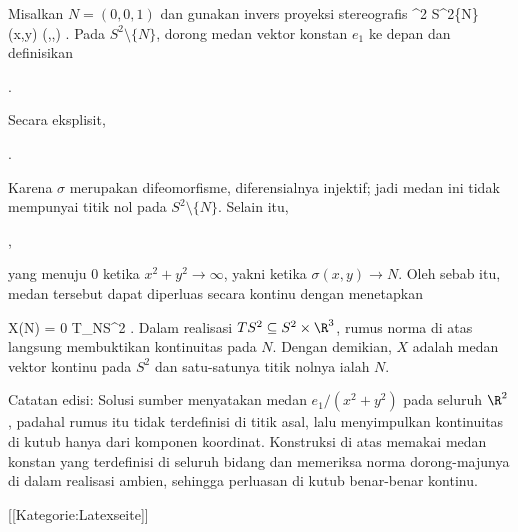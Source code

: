 Misalkan $N=(0,0,1)$ dan gunakan invers proyeksi stereografis
\maabbeledisp {\sigma} {\R^2} {S^2\setminus\{N\}
} {(x,y)} {\left(,,\right)
} {.}
Pada $S^2\setminus\{N\}$, dorong medan vektor konstan $e_1$ ke depan dan definisikan

 { . }

Secara eksplisit,

 { . }

Karena $\sigma$ merupakan difeomorfisme, diferensialnya injektif; jadi medan ini tidak mempunyai titik nol pada $S^2\setminus\{N\}$. Selain itu,

 { , }

yang menuju $0$ ketika $x^2+y^2\to\infty$, yakni ketika $\sigma(x,y)\to N$. Oleh sebab itu, medan tersebut dapat diperluas secara kontinu dengan menetapkan

\mavergleichskettedisp
{\vergleichskette
{X(N)
}
{ =} {0
}
{ \in }{T_NS^2
}
{ } {
}
{ } {
}
}
{}{}{.}
Dalam realisasi $TS^2\subseteq S^2\times\R^3$, rumus norma di atas langsung membuktikan kontinuitas pada $N$. Dengan demikian, $X$ adalah medan vektor kontinu pada $S^2$ dan satu-satunya titik nolnya ialah $N$.

Catatan edisi: Solusi sumber menyatakan medan $e_1/(x^2+y^2)$ pada seluruh $\R^2$, padahal rumus itu tidak terdefinisi di titik asal, lalu menyimpulkan kontinuitas di kutub hanya dari komponen koordinat. Konstruksi di atas memakai medan konstan yang terdefinisi di seluruh bidang dan memeriksa norma dorong-majunya di dalam realisasi ambien, sehingga perluasan di kutub benar-benar kontinu.

 [[Kategorie:Latexseite]]
